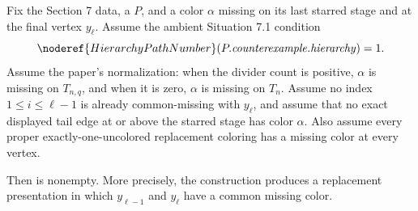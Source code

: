 \begin{lemma}
Fix the Section 7 data, a
 \(P\), and a color \(\alpha\)
missing on its last starred stage and at the final vertex \(y_\ell\).
Assume the ambient Situation 7.1 condition
\[
 \noderef{HierarchyPathNumber}
   (P.\mathit{counterexample}.\mathit{hierarchy})=1.
\]
Assume the paper's normalization: when the divider count is positive,
\(\alpha\) is missing on \(T_{n,q}\), and when it is zero, \(\alpha\) is
missing on \(T_n\).  Assume no index \(1\leq i\leq\ell-1\) is already
common-missing with \(y_\ell\), and assume that no exact displayed tail
edge at or above the starred stage has color \(\alpha\).  Also assume every
proper exactly-one-uncolored replacement coloring has a missing color at
every vertex.

Then  is nonempty.
More precisely, the construction produces a replacement presentation in
which \(y_{\ell-1}\) and \(y_\ell\) have a common missing color.
\end{lemma}
